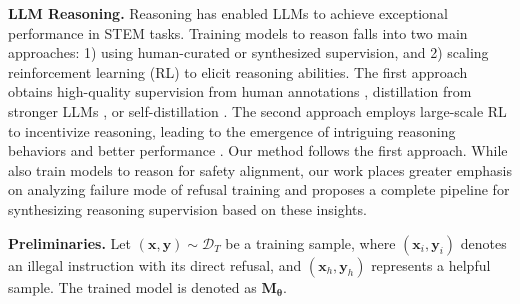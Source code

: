 \vspace{-0.13cm}
\textbf{LLM Reasoning.} Reasoning has enabled LLMs to achieve exceptional performance in STEM tasks. Training models to reason falls into two main approaches: 1) using human-curated or synthesized supervision, and 2) scaling reinforcement learning (RL) to elicit reasoning abilities. The first approach obtains high-quality supervision from human annotations \cite{uesato2022solving,lightman2023let}, distillation from stronger LLMs \cite{yu2023metamath,mitra2024orca}, or self-distillation \cite{zelikman2022star,yuan2023scaling,wang2024math,guan2025rstar}.
The second approach employs large-scale RL to incentivize reasoning, leading to the emergence of intriguing reasoning behaviors and better performance \cite{o1,guo2025deepseek}. Our method follows the first approach. While \citet{guan2024deliberative} also train models to reason for safety alignment, our work places greater emphasis on analyzing failure mode of refusal training and proposes a complete pipeline for synthesizing reasoning supervision based on these insights.


\vspace{-0.13cm}
\textbf{Preliminaries.} Let $(\bm{x}, \bm{y})\sim \mathcal{D}_T$ be a training sample, where $(\bm{x}_i, \bm{y}_i)$ denotes an illegal instruction with its direct refusal, and $(\bm{x}_h, \bm{y}_h)$ represents a helpful sample. The trained model is denoted as $\bm{M}_{{\bm{\theta}}}$.


\vspace{-0.2cm}